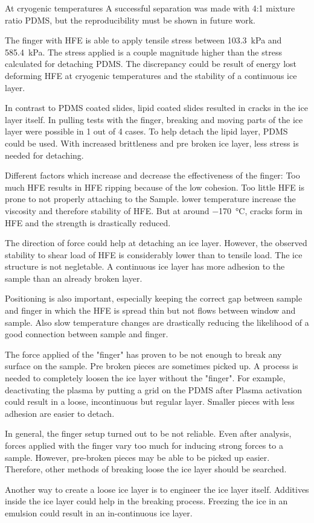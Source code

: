 At cryogenic temperatures %
A successful separation was made with 4:1 mixture ratio PDMS, but the reproducibility must be shown in future work.

The finger with HFE is able to apply tensile stress between \SI{103.3}{\kilo\pascal} and \SI{585.4}{\kilo\pascal}. The stress applied is a couple magnitude higher than the stress calculated for detaching PDMS. The discrepancy could be result of energy lost deforming HFE at cryogenic temperatures and the stability of a continuous ice layer.

In contrast to PDMS coated slides, lipid coated slides resulted in cracks in the ice layer itself. In pulling tests with the finger, breaking and moving parts of the ice layer were possible in 1 out of 4 cases. To help detach the lipid layer, PDMS could be used. With increased brittleness and pre broken ice layer, less stress is needed for detaching.

Different factors which increase and decrease the effectiveness of the finger: Too much HFE results in HFE ripping because of the low cohesion. Too little HFE is prone to not properly attaching to the Sample. lower temperature increase the viscosity and therefore stability of HFE. But at around \SI{-170}{\degreeCelsius}, cracks form in HFE and the strength is drastically reduced.

The direction of force could help at detaching an ice layer. However, the observed stability to shear load of HFE is considerably lower than to tensile load. The ice structure is not negletable. A continuous ice layer has more adhesion to the sample than an already broken layer. 

Positioning is also important, especially keeping the correct gap between sample and finger in which the HFE is spread thin but not flows between window and sample. Also slow temperature changes are drastically reducing the likelihood of a good connection between sample and finger.

The force applied of the "finger" has proven to be not enough to break any surface on the sample. Pre broken pieces are sometimes picked up. A process is needed to completely loosen the ice layer without the "finger". For example, deactivating the plasma by putting a grid on the PDMS after Plasma activation could result in a loose, incontinuous but regular layer. Smaller pieces with less adhesion are easier to detach.

In general, the finger setup turned out to be not reliable. Even after analysis, forces applied with the finger vary too much for inducing strong forces to a sample. However, pre-broken pieces may be able to be picked up easier. Therefore, other methods of breaking loose the ice layer should be searched.

Another way to create a loose ice layer is to engineer the ice layer itself. Additives inside the ice layer could help in the breaking process. Freezing the ice in an emulsion could result in an in-continuous ice layer. 

